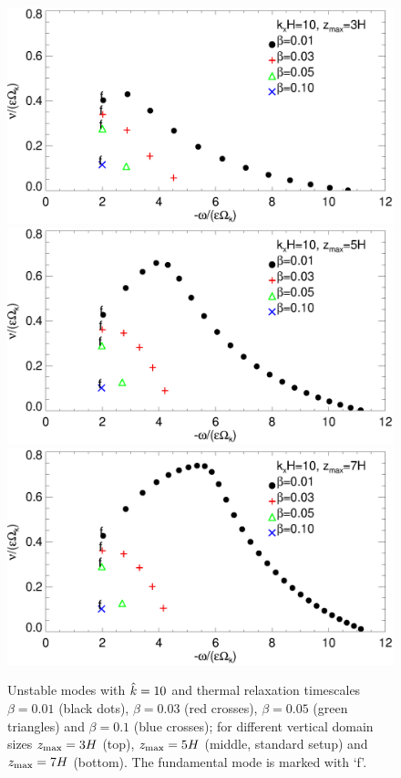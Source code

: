 \begin{figure}
  \includegraphics[width=\linewidth,clip=true,trim=0cm 1.75cm 0cm
  0cm]{figures/compare_modes_cool_kx10_z3.ps} 
  \includegraphics[width=\linewidth,clip=true,trim=0cm 1.75cm 0cm
  0cm]{figures/compare_modes_cool_kx10_z5.ps}
  \includegraphics[width=\linewidth]{figures/compare_modes_cool_kx10_z7.ps}
  \caption{Unstable modes with $\hat{k}=10$ and thermal
    relaxation timescales $\beta=0.01$ (black dots), $\beta=0.03$ (red
    crosses), $\beta=0.05$ (green triangles) and $\beta=0.1$ (blue
    crosses); for different vertical domain sizes $z_\mathrm{max}=3H$ (top),
    $z_\mathrm{max}=5H$ (middle, standard setup) and $z_\mathrm{max}=7H$ (bottom). The
    fundamental mode is marked with `f'. 
    \label{compare_modes_cool_kx10} 
  }
\end{figure}

